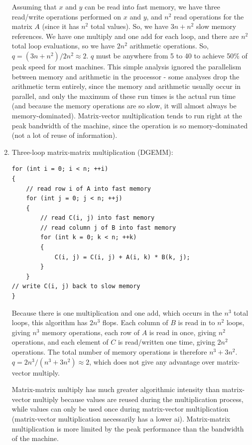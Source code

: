 \documentclass[10pt]{article}
\begin{document}
\begin{flushleft}
\begin{enumerate}
Assuming that \(x\) and \(y\) can be read into fast memory, we have three read/write operations performed on \(x\) and \(y\), and \(n^2\) read operations for the matrix \(A\) (since it has \(n^2\) total values). So, we have \(3n+n^2\) slow memory references. We have one multiply and one add for each loop, and there are \(n^2\) total loop evaluations, so we have \(2n^2\) arithmetic operations. So, \(q=(3n+n^2)/2n^2\approx2\). \(q\) must be anywhere from 5 to 40 to achieve 50\% of peak speed for most machines. This simple analysis ignored the parallelism between memory and arithmetic in the processor - some analyses drop the arithmetic term entirely, since the memory and arithmetic usually occur in parallel, and only the maximum of these run times is the actual run time (and because the memory operations are so slow, it will almost always be memory-dominated). Matrix-vector multiplication tends to run right at the peak bandwidth of the machine, since the operation is so memory-dominated (not a lot of reuse of information).

\item Three-loop matrix-matrix multiplication (DGEMM): 

\begin{lstlisting}[basicstyle=\ttfamily\small]
for (int i = 0; i < n; ++i)
{
	// read row i of A into fast memory
	for (int j = 0; j < n; ++j)
	{	
		// read C(i, j) into fast memory
		// read column j of B into fast memory
		for (int k = 0; k < n; ++k)
		{
			C(i, j) = C(i, j) + A(i, k) * B(k, j);
		}
	}
// write C(i, j) back to slow memory
}
\end{lstlisting}

Because there is one multiplication and one add, which occurs in the \(n^3\) total loops, this algorithm has \(2n^3\) flops. Each column of \(B\) is read in to \(n^2\) loops, giving \(n^3\) memory operations, each row of \(A\) is read in once, giving \(n^2\) operations, and each element of \(C\) is read/written one time, giving \(2n^2\) operations. The total number of memory operations is therefore \(n^3+3n^2\). \(q=2n^3/(n^3+3n^2)\approx 2\), which does not give any advantage over matrix-vector multiply.

Matrix-matrix multiply has much greater algorithmic intensity than matrix-vector multiply because values are reused during the multiplication process, while values can only be used once during matrix-vector multiplication (matrix-vector multiplication necessarily has a lower \gls{ai}). Matrix-matrix multiplication is more limited by the peak performance than the bandwidth of the machine.


\end{enumerate}
\end{flushleft}
\end{document}
